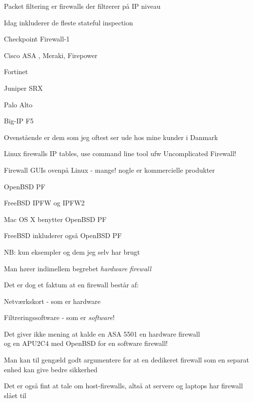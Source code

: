 \documentclass[Screen16to9,17pt]{foils}
\begin{document}
\begin{list1}
\item Packet filtering er firewalls der filtrerer på IP niveau
\item Idag inkluderer de fleste stateful inspection
\end{list1}

\begin{list2}
\item Checkpoint Firewall-1 
\item Cisco ASA , Meraki, Firepower
\item Fortinet 
\item Juniper SRX 
\item Palo Alto 
\item Big-IP F5 
\end{list2}

Ovenstående er dem som jeg oftest ser ude hos mine kunder i Danmark

\begin{list2}
\item Linux firewalls IP tables, use command line tool ufw Uncomplicated Firewall!
\item Firewall GUIs ovenpå Linux - mange!
nogle er kommercielle produkter
\item OpenBSD PF
\item FreeBSD IPFW og IPFW2 
\item Mac OS X benytter OpenBSD PF
\item FreeBSD inkluderer også OpenBSD PF
\item {}
\end{list2}

NB: kun eksempler og dem jeg selv har brugt




\begin{list1}
\item Man hører indimellem begrebet \emph{hardware firewall}
\item Det er dog et faktum at en firewall består af:
\begin{list2}
\item Netværkskort - som er hardware
\item Filtreringssoftware - som er \emph{software}!
\end{list2}
\item Det giver ikke mening at kalde en ASA 5501 en hardware firewall\\
  og en APU2C4 med OpenBSD for en software firewall!
\item Man kan til gengæld godt argumentere for at en dedikeret
  firewall som en separat enhed kan give bedre sikkerhed
  \item Det er også fint at tale om host-firewalls, altså at servere og laptops har firewall slået til
\end{list1}
\end{document}
